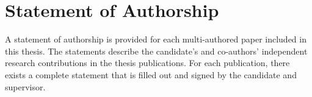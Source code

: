 \chapter{Statement of Authorship}
\label{appendix:auth}

A statement of authorship is provided for each multi-authored paper included in this thesis.
The statements describe the candidate's and co-authors' independent research contributions
in the thesis publications. For each publication, there exists a complete statement that is filled
out and signed by the candidate and supervisor.

\clearpage


% 

% 
